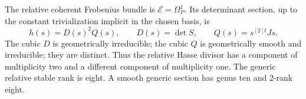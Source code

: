 \begin{proposition}
\label{prop:ss-product-relative-Hasse}
The relative coherent Frobenius bundle is $\mathcal E=\Omega^1_P$.
Its determinant section, up to the constant trivialization implicit in
the chosen basis, is
\begin{equation}\label{eq:ss-product-Hasse-factorization}
 h(s)=D(s)^2Q(s),\qquad
 D(s)=\det S,\qquad Q(s)=s^{[2]t}Js.
\end{equation}
The cubic $D$ is geometrically irreducible; the cubic $Q$ is
geometrically smooth and irreducible; they are distinct. Thus the
relative Hasse divisor has a component of multiplicity two and a
different component of multiplicity one. The generic relative stable
rank is eight. A smooth generic section has genus ten and $2$-rank eight.
\end{proposition}


